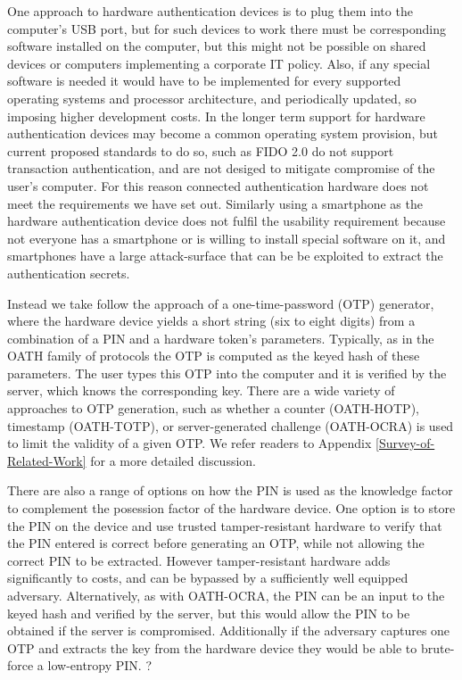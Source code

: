 One approach to hardware authentication devices is to plug them into the computer's USB port, but for such devices to work there must be corresponding software installed on the computer, but this might not be possible on shared devices or computers implementing a corporate IT policy.
Also, if any special software is needed it would have to be implemented for every supported operating systems and processor architecture, and periodically updated, so imposing higher development costs.
In the longer term support for hardware authentication devices may become a common operating system provision, but current proposed standards to do so, such as FIDO 2.0 do not support transaction authentication, and are not desiged to mitigate compromise of the user's computer.
For this reason connected authentication hardware does not meet the requirements we have set out.
Similarly using a smartphone as the hardware authentication device does not fulfil the usability requirement because not everyone has a smartphone or is willing to install special software on it, and smartphones have a large attack-surface that can be be exploited to extract the authentication secrets.

Instead we take follow the approach of a one-time-password (OTP) generator, where the hardware device yields a short string (\eg six to eight digits) from a combination of a PIN and a hardware token's parameters. Typically, as in the OATH family of protocols the OTP is computed as the keyed hash of these parameters. The user types this OTP into the computer and it is verified by the server, which knows the corresponding key. There are a wide variety of approaches to OTP generation, such as whether a counter (\eg OATH-HOTP), timestamp (\eg OATH-TOTP), or server-generated challenge (\eg OATH-OCRA) is used to limit the validity of a given OTP.  We refer readers to Appendix \ref{Survey-of-Related-Work} for a more detailed discussion.

There are also a range of options on how the PIN is used as the knowledge factor to complement the posession factor of the hardware device.
One option is to store the PIN on the device and use trusted tamper-resistant hardware to verify that the PIN entered is correct before generating an OTP, while not allowing the correct PIN to be extracted.
However tamper-resistant hardware adds significantly to costs, and can be bypassed by a sufficiently well equipped adversary.
Alternatively, as with OATH-OCRA, the PIN can be an input to the keyed hash and verified by the server, but this would allow the PIN to be obtained if the server is compromised.
Additionally if the adversary captures one OTP and extracts the key from the hardware device they would be able to brute-force a low-entropy PIN.
?

